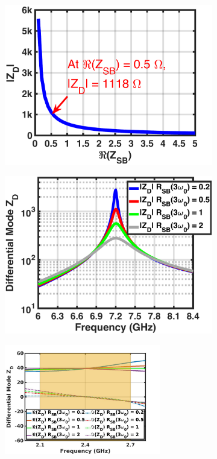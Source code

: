\documentclass[conference]{IEEEtran}
\begin{document}
\begin{figure}[!t]
\captionsetup{font=footnotesize}
\centering
\begin{subfigure}{0.24\textwidth}
\includegraphics[width=1\textwidth]{Images/Design/Design_A_Zn_3H.pdf}
\caption{}
\label{fig:Design_A_Zn_3H}
\end{subfigure}
\begin{subfigure}{0.24\textwidth}
\includegraphics[width=1\textwidth]{Images/Design/Design_A_Rn_var_3H.pdf}
\caption{}
\label{fig:Design_A_Rn_var_3H}
\end{subfigure}
\begin{subfigure}{0.5\textwidth}
\centering
\includegraphics[width=0.75\textwidth]{Images/Design/Design_A_Rn_var_1H.pdf}

\end{subfigure}
\end{figure}
\end{document}

